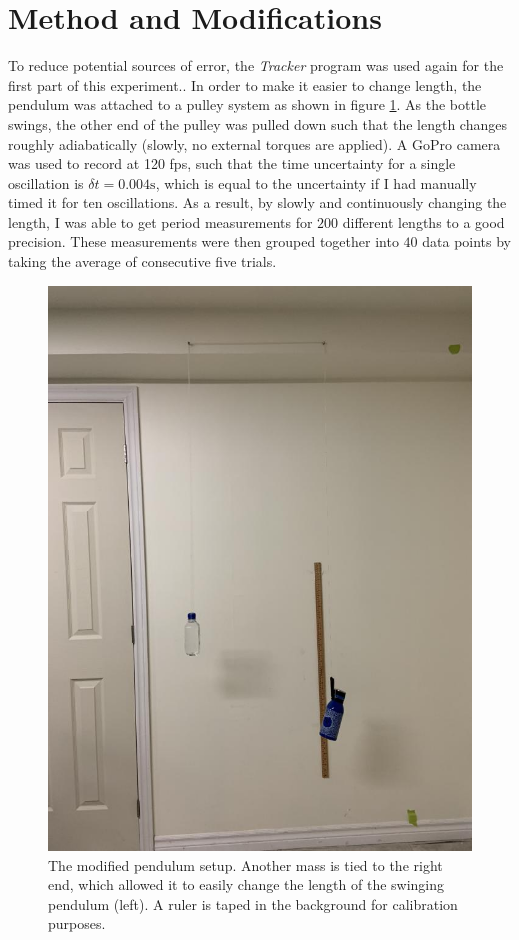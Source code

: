 \documentclass[%
 reprint,
 amsmath,amssymb
 aps,
]{revtex4-2}
\begin{document}
\section{Method and Modifications}
To reduce potential sources of error, the \textit{Tracker} program was used again for the first part of this experiment.. In order to make it easier to change length, the pendulum was attached to a pulley system as shown in figure \ref{fig:cool}. As the bottle swings, the other end of the pulley was pulled down such that the length changes roughly adiabatically (slowly, no external torques are applied). A GoPro camera was used to record at 120 fps, such that the time uncertainty for a single oscillation is $\delta t = 0.004 \si{\second}$, which is equal to the uncertainty if I had manually timed it for ten oscillations. As a result, by slowly and continuously changing the length, I was able to get period measurements for $200$ different lengths to a good precision. These measurements were then grouped together into $40$ data points by taking the average of consecutive five trials.
\begin{figure}[!h]
    \includegraphics[width=\linewidth]{Figures/cool_beans.jpg}

    \caption{The modified pendulum setup. Another mass is tied to the right end, which allowed it to easily change the length of the swinging pendulum (left). A ruler is taped in the background for calibration purposes.}
    \label{fig:cool}
\end{figure}
\end{document}
